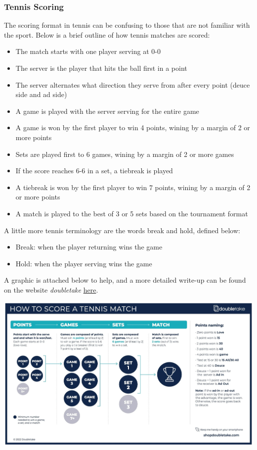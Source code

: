 \documentclass[
  letterpaper,
  DIV=11,
  numbers=noendperiod]{scrartcl}
\providecommand{\tightlist}{%
  \setlength{\itemsep}{0pt}\setlength{\parskip}{0pt}}\usepackage{longtable,booktabs,array}
\begin{document}
\subsubsection{Tennis Scoring}\label{sec-scoring}

The scoring format in tennis can be confusing to those that are not
familiar with the sport. Below is a brief outline of how tennis matches
are scored:

\begin{itemize}
\tightlist
\item
  The match starts with one player serving at 0-0
\item
  The server is the player that hits the ball first in a point
\item
  The server alternates what direction they serve from after every point
  (deuce side and ad side)
\item
  A game is played with the server serving for the entire game
\item
  A game is won by the first player to win 4 points, wining by a margin
  of 2 or more points
\item
  Sets are played first to 6 games, wining by a margin of 2 or more
  games
\item
  If the score reaches 6-6 in a set, a tiebreak is played
\item
  A tiebreak is won by the first player to win 7 points, wining by a
  margin of 2 or more points
\item
  A match is played to the best of 3 or 5 sets based on the tournament
  format
\end{itemize}

A little more tennis terminology are the words break and hold, defined
below:

\begin{itemize}
\tightlist
\item
  Break: when the player returning wins the game
\item
  Hold: when the player serving wins the game
\end{itemize}

A graphic is attached below to help, and a more detailed write-up can be
found on the website \emph{doubletake}
\href{https://www.shopdoubletake.com/blogs/well-played/tennis-scoring-101}{here}.

\includegraphics{tennis_scoring.jpeg}
\end{document}
